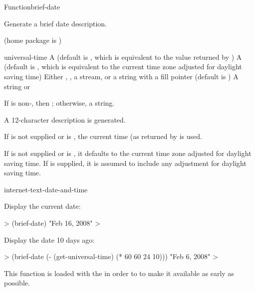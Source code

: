 \documentclass[10pt,twoside,english,pdftex]{article}
\begin{document}
\begin{functiondoc}{Function}{brief-date}{%
     
    \returns{} }
% 
% 

\fnsyntax

\fnpurpose Generate a brief date description.

\fnpackage {} (home package is )

\fnmodule {}

\fnargs
\begin{args}{universal-time}
 A  (default is \nil,
  which is equivalent to the value returned by
  )
 A  (default is \nil,
  which is equivalent to the current time zone adjusted for daylight
  saving time)
\arg[destination] Either \nil, , a stream, or a string with a fill 
pointer (default is \nil)
\arg[result] A string or \nil{}
\end{args}

\fnreturns If  is non-\nil, then \nil; otherwise, a string.

\fndescription 
A 12-character description is generated.

\W{}
%
If  is not supplied or is \nil, the current time
(as returned by  is used.  

\W{} If  is not supplied or is \nil, it defaults to the
current time zone adjusted for daylight saving time. If
 is supplied, it is assumed to include any adjustment
for daylight saving time.

\begin{alsos}{internet-text-date-and-time}
\end{alsos}

\fnexamples
Display the current date: 
%
\W\supp
\begin{example}
  > (brief-date)
  "Feb 16, 2008"
  >
\end{example}
%
Display the date 10 days ago:
%
\W\supp\notpretop
\begin{example}
  > (brief-date (- (get-universal-time) (* 60 60 24 10)))
  "Feb 6, 2008"
  >
\end{example}

\fnnote
{}%
%
%
This function is loaded with the  
in order to to make it available as early as possible.

\end{functiondoc}
\end{document}
